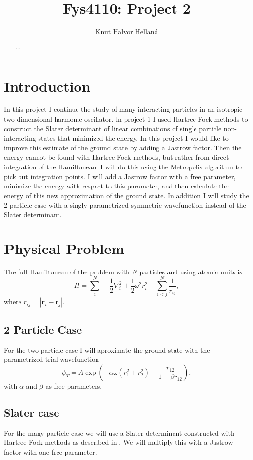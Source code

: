 \documentclass[a4paper,norsk,10pt]{article}
\title{Fys4110: Project 2}
\author{Knut Halvor Helland}
\newcommand{\bb}[1]{\boldsymbol{#1}}
\newcommand{\be}{\begin{equation}}
\newcommand{\ee}{\end{equation}}
\newcommand{\f}{\frac}
\begin{document}
\maketitle{}
\begin{abstract}
$\ldots$
\end{abstract}


\section{Introduction}
In this project I continue the study of many interacting particles in an isotropic two dimensional harmonic oscillator.
In project 1 \cite{proj1} I used Hartree-Fock methods to construct the Slater determinant of linear combinations of single
particle non-interacting states that minimized the energy. In this project I would like to improve this estimate of the ground state
by adding a Jastrow factor. Then the energy cannot be found with Hartree-Fock methods, but rather from direct integration of the Hamiltonean.
I will do this using the Metropolis algorithm to pick out integration points.
I will add a Jastrow factor with a free parameter, minimize the energy with respect to this parameter, and
then calculate the energy of this new approximation of the ground state.
In addition I will study the 2 particle case with a singly parametrized symmetric wavefunction instead of the Slater determinant.


\section{Physical Problem}
The full Hamiltonean of the problem with $N$ particles and using atomic units is
\be
H = \sum_i^N -\f{1}{2}\nabla^2_i + \f{1}{2}\omega^2r^2_i + \sum_{i<j}^N\f{1}{r_{ij}}, \label{ham}
\ee
where $r_{ij} = |\bb{r}_i-\bb{r}_j|$.

\subsection{2 Particle Case}
For the two particle case I will aproximate the ground state with the parametrized trial wavefunction
\be
\psi_T = A\exp\left(-\alpha\omega(r_1^2 + r_2^2) -\f{r_{12}}{1+\beta r_{12}}\right),\label{2pw}
\ee
with $\alpha$ and $\beta$ as free parameters.

\subsection{Slater case}
For the many particle case we will use a Slater determinant constructed with Hartree-Fock methods as described in \cite{proj1}.
We will multiply this with a Jastrow factor with one free parameter.
\end{document}
